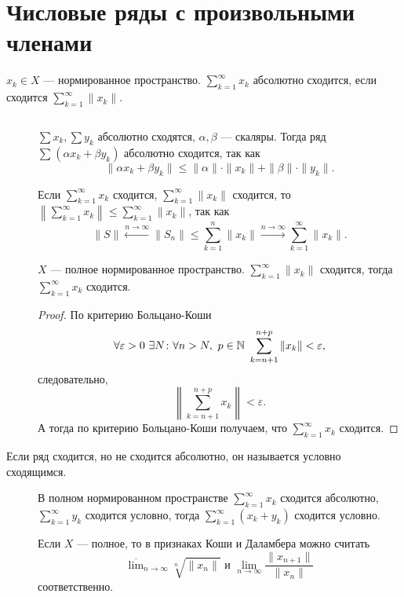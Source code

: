 \section{Числовые ряды с произвольными членами}
\begin{defn}
    $ x_k \in  X$ --- нормированное пространство. 
	$ \sum_{k=1}^{\infty} x_k$ {\sf абсолютно сходится}, если сходится $ \sum_{k=1}^{\infty} \| x_k \| $.
\end{defn}
\begin{prop}
    $ $
    \begin{description}
	\item[] $ \sum x_k, \sum y_k $ абсолютно сходятся,  $ \alpha , \beta $ --- скаляры. Тогда ряд $ \sum_{}^{} ( \alpha x_k + \beta y_k)$ абсолютно сходится, так как
	    \[
	    \|  \alpha x_k + \beta  y_k \|  \le \| \alpha  \| \cdot \|  x_k \|  + \| \beta  \| \cdot  \|  y_k \| 
	    .\] 
	\item[] 
		Если $ \sum_{k=1}^{\infty} x_k$ сходится, $ \sum_{k=1}^{\infty} \| x_k \| $ сходится,
		то $ \left\| \sum_{k=1}^{\infty}  x_k\right\| \le \sum_{k=1}^{\infty} \| x_k \| $, так как
	    \[
		\| S \| \stackrel{n \to  \infty}{\longleftarrow} \| S_n \| \le \sum_{k=1}^{n} \|  x_k \|  \stackrel{n \to  \infty}{\longrightarrow} \sum_{k=1}^{\infty} \| x_k \| 
	    .\] 

	\item[] 
		$ X$ --- полное нормированное пространство.
		$ \sum_{k=1}^{\infty} \| x_k \|   $ сходится, тогда $ \sum_{k=1}^{\infty} x_k$ сходится.
	    \begin{proof}
			По критерию Больцано-Коши
		    $$ \forall  \varepsilon >0 ~ \exists  N \colon  \forall n > N ,~ p \in  \mathbb{N} ~ \sum_{k = n+1}^{n+p} \| x_k \|  < \varepsilon ,$$
			следовательно, 
			$$ \left\| \sum_{k = n+1}^{n+p} x_k \right\| < \varepsilon .$$
			А тогда по критерию Больцано-Коши получаем, что $ \sum_{k=1}^{\infty} x_k$ сходится.
	    \end{proof}
\end{description}
\begin{defn}
    Если ряд сходится, но не сходится абсолютно, он называется {\sf условно сходящимся.}  
\end{defn}
\begin{description}
	\item[]
		В полном нормированном пространстве $ \sum_{k=1}^{\infty} x_k$ сходится абсолютно,
		$ \sum_{k=1}^{\infty} y_k$ сходится условно,
		тогда $ \sum_{k=1}^{\infty} (x_k+ y_k)$ сходится условно.

	\item[] 
		Если $ X $ --- полное, то в признаках Коши и Даламбера можно считать 
		$$ \overline{\lim}_{n \to  \infty} \sqrt[n]{ \|  x_n \| }  \text{ и } \lim_{n \to \infty} \frac{\| x_{n+1} \| }{\| x_n \| }$$ соответственно.

    \end{description}
\end{prop}

